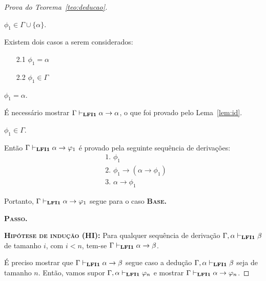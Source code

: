\begin{proof}[Prova do Teorema~\ref{teo:deducao}]
\begin{provaporcasos}
                \casodeprova{} $\phi_{1} \in \Gamma \cup \{\alpha\}$. 
                
                Existem dois casos a serem considerados:

                \begin{enumerate}
                    \item[2.1] $\phi_{1} = \alpha$
                    \item[2.2] $\phi_{1} \in \Gamma$
                \end{enumerate}

                \begin{provaporsubcasos}
                    \subcasodeprova{} $\phi_{1} = \alpha$. 
                    
                        É necessário mostrar $\Gamma \vdash_{{\normalfont\textbf{LFI1}}{}} \alpha \to \alpha$, o que foi provado pelo Lema~\ref{lem:id}.

                    \subcasodeprova{} $\phi_{1} \in \Gamma$.
                    
                        Então $\Gamma \vdash_{{\normalfont\textbf{LFI1}}{}} \alpha \to \varphi_{1}$ é provado pela seguinte sequência de derivações:
                        \begin{align*}
                            & \text{1. } \phi_{1} \tag{Premissa}\\
                            & \text{2. } \phi_{1} \to (\alpha \to \phi_{1}) \tag{Ax1}\\
                            & \text{3. } \alpha \to \phi_{1} \tag{MP 1, 2}
                        \end{align*}
                \end{provaporsubcasos}
                
            \end{provaporcasos}
            
            Portanto, $\Gamma \vdash_{{\normalfont\textbf{LFI1}}{}} \alpha \to \varphi_{1}$ segue para o caso \textbf{\textsc{Base.}}


        \noindent \textbf{\textsc{Passo.}}

        \noindent \textbf{\textsc{Hipótese de indução (HI):}} Para qualquer sequência de derivação $\Gamma, \alpha \vdash_{{\normalfont\textbf{LFI1}}{}} \beta$ de tamanho $i$, com $i < n$, tem-se $\Gamma \vdash_{{\normalfont\textbf{LFI1}}{}} \alpha \to \beta$. 

        É preciso mostrar que $\Gamma \vdash_{{\normalfont\textbf{LFI1}}{}} \alpha \to \beta$ segue caso a dedução $\Gamma, \alpha \vdash_{{\normalfont\textbf{LFI1}}{}} \beta$ seja de tamanho $n$. Então, vamos supor $\Gamma, \alpha \vdash_{{\normalfont\textbf{LFI1}}{}} \varphi_{n}$ e mostrar $\Gamma \vdash_{{\normalfont\textbf{LFI1}}{}} \alpha \to \varphi_{n}$.
        

\end{proof}
